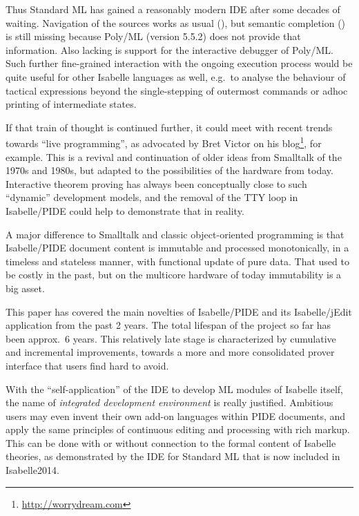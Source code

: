 \begin{isabellebody}
\begin{isamarkuptext}
Thus Standard ML has gained a reasonably modern IDE after some decades of
waiting. Navigation of the sources works as usual (),
but semantic completion () is still missing because
Poly/ML (version 5.5.2) does not provide that information. Also lacking is
support for the interactive debugger of Poly/ML. Such further fine-grained
interaction with the ongoing execution process would be quite useful for
other Isabelle languages as well, e.g.\ to analyse the behaviour of tactical
expressions beyond the single-stepping of outermost commands or adhoc
printing of intermediate states.

\medskip If that train of thought is continued further, it could meet with
recent trends towards ``live programming'', as advocated by Bret Victor on
his blog\footnote{\url{http://worrydream.com}}, for example. This is a
revival and continuation of older ideas from Smalltalk of the 1970s and
1980s, but adapted to the possibilities of the hardware from today.
Interactive theorem proving has always been conceptually close to such
``dynamic'' development models, and the removal of the TTY loop in
Isabelle/PIDE could help to demonstrate that in reality.

A major difference to Smalltalk and classic object-oriented programming is
that Isabelle/PIDE document content is immutable and processed
monotonically, in a timeless and stateless manner, with functional update of
pure data. That used to be costly in the past, but on the multicore hardware
of today immutability is a big asset.%
\end{isamarkuptext}%
\isamarkuptrue%
%
\isamarkuptrue%
%
\begin{isamarkuptext}%
This paper has covered the main novelties of Isabelle/PIDE and its
Isabelle/jEdit application from the past 2 years. The total lifespan of the
project so far has been approx.\ 6 years. This relatively late stage is
characterized by cumulative and incremental improvements, towards a more and
more consolidated prover interface that users find hard to avoid.

With the ``self-application'' of the IDE to develop ML modules of Isabelle
itself, the name of \emph{integrated development environment} is really
justified. Ambitious users may even invent their own add-on languages within
PIDE documents, and apply the same principles of continuous editing and
processing with rich markup. This can be done with or without connection to
the formal content of Isabelle theories, as demonstrated by the IDE for
Standard ML that is now included in Isabelle2014.


\end{isamarkuptext}
\end{isabellebody}
